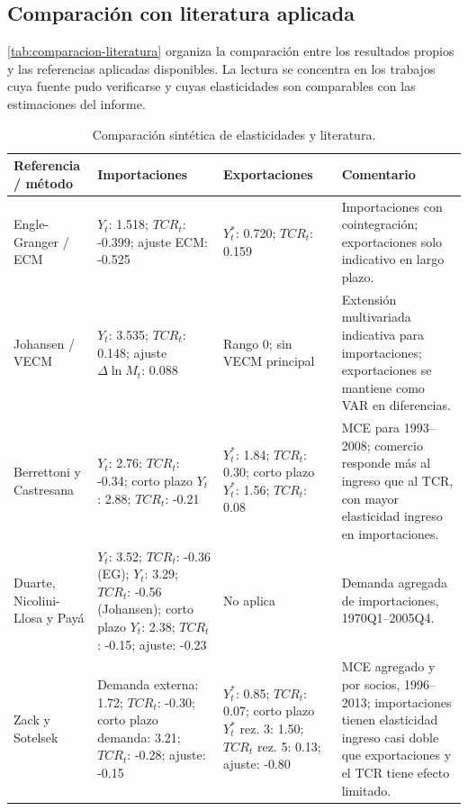 \documentclass[11pt,a4paper]{article}
\begin{document}
	\subsection{Comparación con literatura aplicada}
	\label{subsec:comparacion-literatura}

\autoref{tab:comparacion-literatura} organiza la comparación entre los
resultados propios y las referencias aplicadas disponibles. La lectura se
concentra en los trabajos cuya fuente pudo verificarse y cuyas elasticidades
son comparables con las estimaciones del informe.

\begin{table}[H]
\centering
\caption{Comparación sintética de elasticidades y literatura.}
\label{tab:comparacion-literatura}
\scriptsize
\setlength{\tabcolsep}{4pt}
\begin{tabular}{p{2.8cm}p{3.2cm}p{3.2cm}p{4.1cm}}
\toprule
Referencia / método & Importaciones & Exportaciones & Comentario \\
\midrule
Engle-Granger / ECM & \(Y_t\): 1.518; \(TCR_t\): -0.399; ajuste ECM: -0.525 & \(Y_t^*\): 0.720; \(TCR_t\): 0.159 & Importaciones con cointegración; exportaciones solo indicativo en largo plazo. \\
Johansen / VECM & \(Y_t\): 3.535; \(TCR_t\): 0.148; ajuste \(\Delta \ln M_t\): 0.088 & Rango 0; sin VECM principal & Extensión multivariada indicativa para importaciones; exportaciones se mantiene como VAR en diferencias. \\
Berrettoni y Castresana \cite{berrettoni_castresana_2008} & \(Y_t\): 2.76; \(TCR_t\): -0.34; corto plazo \(Y_t\): 2.88; \(TCR_t\): -0.21 & \(Y_t^*\): 1.84; \(TCR_t\): 0.30; corto plazo \(Y_t^*\): 1.56; \(TCR_t\): 0.08 & MCE para 1993--2008; comercio responde más al ingreso que al TCR, con mayor elasticidad ingreso en importaciones. \\
Duarte, Nicolini-Llosa y Payá \cite{duarte_nicolini_llosa_paya_2007} & \(Y_t\): 3.52; \(TCR_t\): -0.36 (EG); \(Y_t\): 3.29; \(TCR_t\): -0.56 (Johansen); corto plazo \(Y_t\): 2.38; \(TCR_t\): -0.15; ajuste: -0.23 & No aplica & Demanda agregada de importaciones, 1970Q1--2005Q4. \\
Zack y Sotelsek \cite{zack_sotelsek_2016} & Demanda externa: 1.72; \(TCR_t\): -0.30; corto plazo demanda: 3.21; \(TCR_t\): -0.28; ajuste: -0.15 & \(Y_t^*\): 0.85; \(TCR_t\): 0.07; corto plazo \(Y_t^*\) rez. 3: 1.50; \(TCR_t\) rez. 5: 0.13; ajuste: -0.80 & MCE agregado y por socios, 1996--2013; importaciones tienen elasticidad ingreso casi doble que exportaciones y el TCR tiene efecto limitado. \\

\end{tabular}
\end{table}
\end{document}
